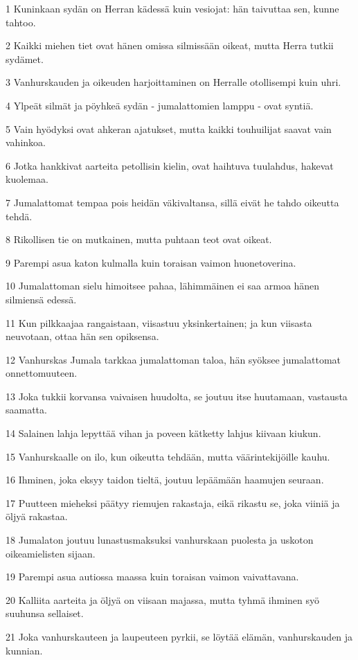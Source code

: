 \par 1 Kuninkaan sydän on Herran kädessä kuin vesiojat: hän taivuttaa sen, kunne tahtoo.
\par 2 Kaikki miehen tiet ovat hänen omissa silmissään oikeat, mutta Herra tutkii sydämet.
\par 3 Vanhurskauden ja oikeuden harjoittaminen on Herralle otollisempi kuin uhri.
\par 4 Ylpeät silmät ja pöyhkeä sydän - jumalattomien lamppu - ovat syntiä.
\par 5 Vain hyödyksi ovat ahkeran ajatukset, mutta kaikki touhuilijat saavat vain vahinkoa.
\par 6 Jotka hankkivat aarteita petollisin kielin, ovat haihtuva tuulahdus, hakevat kuolemaa.
\par 7 Jumalattomat tempaa pois heidän väkivaltansa, sillä eivät he tahdo oikeutta tehdä.
\par 8 Rikollisen tie on mutkainen, mutta puhtaan teot ovat oikeat.
\par 9 Parempi asua katon kulmalla kuin toraisan vaimon huonetoverina.
\par 10 Jumalattoman sielu himoitsee pahaa, lähimmäinen ei saa armoa hänen silmiensä edessä.
\par 11 Kun pilkkaajaa rangaistaan, viisastuu yksinkertainen; ja kun viisasta neuvotaan, ottaa hän sen opiksensa.
\par 12 Vanhurskas Jumala tarkkaa jumalattoman taloa, hän syöksee jumalattomat onnettomuuteen.
\par 13 Joka tukkii korvansa vaivaisen huudolta, se joutuu itse huutamaan, vastausta saamatta.
\par 14 Salainen lahja lepyttää vihan ja poveen kätketty lahjus kiivaan kiukun.
\par 15 Vanhurskaalle on ilo, kun oikeutta tehdään, mutta väärintekijöille kauhu.
\par 16 Ihminen, joka eksyy taidon tieltä, joutuu lepäämään haamujen seuraan.
\par 17 Puutteen mieheksi päätyy riemujen rakastaja, eikä rikastu se, joka viiniä ja öljyä rakastaa.
\par 18 Jumalaton joutuu lunastusmaksuksi vanhurskaan puolesta ja uskoton oikeamielisten sijaan.
\par 19 Parempi asua autiossa maassa kuin toraisan vaimon vaivattavana.
\par 20 Kalliita aarteita ja öljyä on viisaan majassa, mutta tyhmä ihminen syö suuhunsa sellaiset.
\par 21 Joka vanhurskauteen ja laupeuteen pyrkii, se löytää elämän, vanhurskauden ja kunnian.

